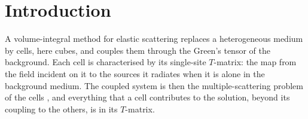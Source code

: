 \documentclass[11pt,a4paper]{article}
\begin{document}
\begin{abstract}
rational function of the contrast and of $k_Sh$, whose poles are written down. In the static limit the
cell separates into independent scalar channels, each of Eshelby's form $MD/(1-ND)$ with one closed-form
constant $N$ per channel; the dilatational channel is Eshelby's sphere exactly, and the two shear channels
average to the sphere's. Through $(k_Sh)^6$ the closed form reproduces the $T$-matrix computed by quadrature to
$3.5\times10^{-9}$ at $k_Sh=0.2$, falling as $(k_Sh)^7$ as the next term predicts, and each of its $223$
moments to $1.7\times10^{-15}$. Because the coefficients depend on neither the frequency, the cell size nor
the medium, a frequency sweep integrates nothing at any frequency: the $T$-matrix costs $0.43$\,ms per frequency
against $1.2$\,s by quadrature, after a one-off derivation of $30$\,s.
\end{abstract}


\section{Introduction}\label{sec:intro}

A volume-integral method for elastic scattering replaces a heterogeneous medium by cells, here cubes, and
couples them through the Green's tensor of the background. Each cell is characterised by its single-site
$T$-matrix: the map from the field incident on it to the sources it radiates when it is alone in the background medium. The coupled
system is then the multiple-scattering problem of the cells
\citep{Foldy1945,Lax1951,Waterman1976,MishchenkoTravisLacis2002}, and everything that a cell contributes to
the solution, beyond its coupling to the others, is in its $T$-matrix.
\end{document}
